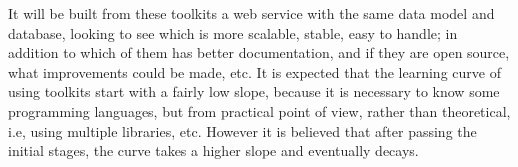 It will be built from these toolkits a web service with the same data model and
database, looking to see which is more scalable, stable, easy to handle; in
addition to which of them has better documentation, and if they are open source, what
improvements could be made, etc. It is expected that the learning curve of using
toolkits start with a fairly low slope, because it is necessary to know
some programming languages, but from practical point of view, rather than
theoretical, i.e, using multiple libraries, etc. However it is believed that
after passing the initial stages, the curve takes a higher slope and eventually
decays.

